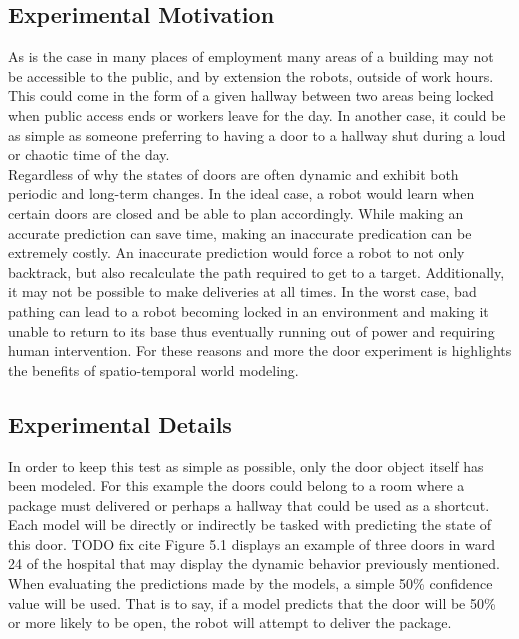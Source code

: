   \subsection{ Experimental Motivation }

  As is the case in many places of employment many areas of a building may not
  be accessible to the public, and by extension the robots, outside of work
  hours. This could come in the form of a given hallway between two areas being
  locked when public access ends or workers leave for the day. In another case, it could be as
  simple as someone preferring to having a door to a hallway shut during a loud
  or chaotic time of the day. \\

  Regardless of why the states of doors are often
  dynamic and exhibit both periodic and long-term changes. In the ideal case, a robot
  would learn when certain doors are closed and be able to plan accordingly.
  While making an accurate prediction can save time, making an inaccurate
  predication can be extremely costly. An inaccurate prediction would force a robot
  to not only backtrack, but also recalculate the path required to get to a
  target. Additionally, it may not be possible to make deliveries at all times.
  In the worst case, bad pathing can lead to a robot becoming locked in an
  environment and making it unable to return to its base thus eventually running out of power and
  requiring human intervention. For these reasons and more the door
  experiment is highlights the benefits of spatio-temporal world
  modeling. \\

  \subsection{ Experimental Details }

  In order to keep this test as simple as possible, only the door
  object itself has been modeled. For this example the doors could belong to a room where a
  package must delivered or perhaps a hallway that could be used as a
  shortcut. Each model will be directly or indirectly be tasked with
  predicting the state of this door. TODO fix cite Figure 5.1 displays an example of three
  doors in ward 24 of the hospital that may display the dynamic behavior
  previously mentioned. \\

  When evaluating the predictions made by the models, a simple 50\% confidence
  value will be used. That is to say, if a model predicts that the door will
  be 50\% or more likely to be open, the robot will attempt to
  deliver the package. \\

